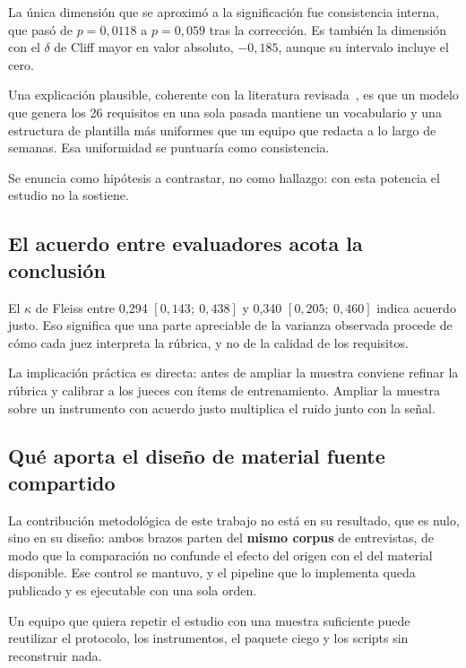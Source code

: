 \documentclass[11pt,a4paper]{article}
\begin{document}
La \'unica dimensi\'on que se aproxim\'o a la significaci\'on fue consistencia interna,
que pas\'o de $p = 0{,}0118$ a $p = 0{,}059$ tras la correcci\'on. Es tambi\'en la
dimensi\'on con el $\delta$ de Cliff mayor en valor absoluto, $-0{,}185$, aunque su
intervalo incluye el cero.

Una explicaci\'on plausible, coherente con la literatura
revisada~\cite{ronanki2023investigating,gorer2023generating}, es que un modelo que
genera los 26 requisitos en una sola pasada mantiene un vocabulario y una estructura de
plantilla m\'as uniformes que un equipo que redacta a lo largo de semanas. Esa
uniformidad se puntuar\'ia como consistencia.

Se enuncia como hip\'otesis a contrastar, no como hallazgo: con esta potencia el estudio
no la sostiene.

\subsection{El acuerdo entre evaluadores acota la conclusi\'on}

El $\kappa$ de Fleiss entre 0,294 $[0{,}143;\ 0{,}438]$ y 0,340 $[0{,}205;\ 0{,}460]$ indica acuerdo justo. Eso significa que una
parte apreciable de la varianza observada procede de c\'omo cada juez interpreta la
r\'ubrica, y no de la calidad de los requisitos.

La implicaci\'on pr\'actica es directa: antes de ampliar la muestra conviene refinar la
r\'ubrica y calibrar a los jueces con \'items de entrenamiento. Ampliar la muestra sobre
un instrumento con acuerdo justo multiplica el ruido junto con la se\~nal.

\subsection{Qu\'e aporta el dise\~no de material fuente compartido}

La contribuci\'on metodol\'ogica de este trabajo no est\'a en su resultado, que es nulo,
sino en su dise\~no: ambos brazos parten del \textbf{mismo corpus} de entrevistas, de
modo que la comparaci\'on no confunde el efecto del origen con el del material
disponible. Ese control se mantuvo, y el pipeline que lo implementa queda publicado y es
ejecutable con una sola orden.

Un equipo que quiera repetir el estudio con una muestra suficiente puede reutilizar el
protocolo, los instrumentos, el paquete ciego y los scripts sin reconstruir nada.
\end{document}
